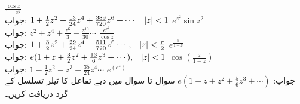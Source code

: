 \quad
$\tfrac{\cos z}{1-z^2}$\\
جواب:\quad
$1+\tfrac{1}{2}z^2+\tfrac{13}{24}z^4+\tfrac{389}{720}z^6+\cdots\,\quad \abs{z}<1$
\quad
$e^{z^2}\sin z^2$\\
جواب:\quad
$z^2+z^4+\tfrac{z^6}{3}-\tfrac{z^{10}}{30}\cdots$
\quad
$\tfrac{e^{z^2}}{\cos z}$\\
جواب:\quad
$1+\tfrac{3}{2}z^2+\tfrac{29}{24}z^4+\tfrac{511}{720}z^6\cdots,\quad \abs{z}<\tfrac{\pi}{2}$
\quad
$e^{\tfrac{1}{1-z}}$\\
جواب:\quad
$e(1+z+\tfrac{3}{2}z^2+\tfrac{13}{6}z^3+\cdots),\quad \abs{z}<1$
\quad
$\cos(\tfrac{z}{1-z})$\\
جواب:\quad
$1-\tfrac{1}{2}z^2-z^3-\tfrac{35}{24}z^4\cdots$
\quad
$e^{(e^z)}$\\
جواب:\quad
$e(1+z+z^2+\tfrac{5}{6}z^3+\cdots)$
سوال  تا سوال  میں دیے تفاعل کا ٹیلر تسلسل  کے گرد دریافت کریں۔

